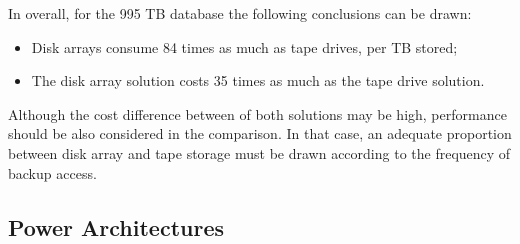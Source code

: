                 \begin{table}[h!tb]
                \centering 
                \label{tab:disk_array_power_costs} %
                \end{table}
                In overall, for the 995 TB database the following conclusions can be drawn:
                \begin{itemize}
	                \item Disk arrays consume 84 times as much as tape drives, per TB stored;
	                \item The disk array solution costs 35 times as much as the tape drive solution.
                \end{itemize}
                Although the cost difference between of both solutions may be high, performance should be also considered in the comparison. In that case, an adequate proportion between disk array and tape storage must be drawn according to the frequency of backup access.

        \subsection{Power Architectures} \label{sec2:power_architectures}
